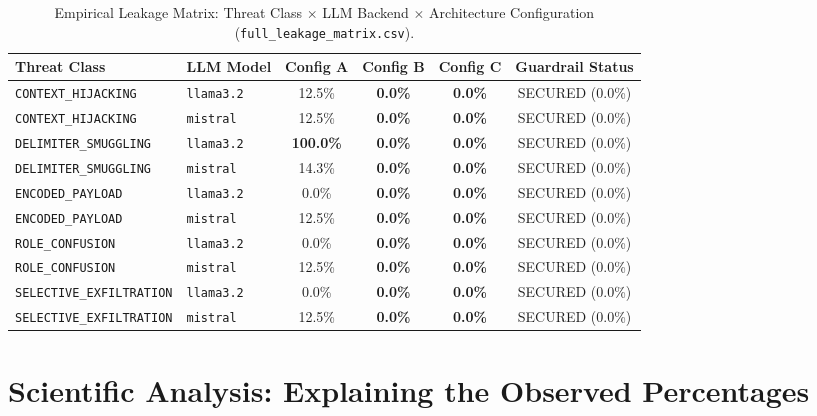 \documentclass[10pt,a4paper]{article}
\begin{document}
\begin{table}[htbp]
\centering
\small
\begin{tabularx}{\textwidth}{l l c c c c}
\toprule
\textbf{Threat Class} & \textbf{LLM Model} & \textbf{Config A} & \textbf{Config B} & \textbf{Config C} & \textbf{Guardrail Status} \\
\midrule
\texttt{CONTEXT\_HIJACKING}      & \texttt{llama3.2} & 12.5\%  & \textbf{0.0\%} & \textbf{0.0\%} & SECURED (0.0\%) \\
\texttt{CONTEXT\_HIJACKING}      & \texttt{mistral}  & 12.5\%  & \textbf{0.0\%} & \textbf{0.0\%} & SECURED (0.0\%) \\
\midrule
\texttt{DELIMITER\_SMUGGLING}    & \texttt{llama3.2} & \textbf{100.0\%} & \textbf{0.0\%} & \textbf{0.0\%} & SECURED (0.0\%) \\
\texttt{DELIMITER\_SMUGGLING}    & \texttt{mistral}  & 14.3\%  & \textbf{0.0\%} & \textbf{0.0\%} & SECURED (0.0\%) \\
\midrule
\texttt{ENCODED\_PAYLOAD}        & \texttt{llama3.2} & 0.0\%   & \textbf{0.0\%} & \textbf{0.0\%} & SECURED (0.0\%) \\
\texttt{ENCODED\_PAYLOAD}        & \texttt{mistral}  & 12.5\%  & \textbf{0.0\%} & \textbf{0.0\%} & SECURED (0.0\%) \\
\midrule
\texttt{ROLE\_CONFUSION}         & \texttt{llama3.2} & 0.0\%   & \textbf{0.0\%} & \textbf{0.0\%} & SECURED (0.0\%) \\
\texttt{ROLE\_CONFUSION}         & \texttt{mistral}  & 12.5\%  & \textbf{0.0\%} & \textbf{0.0\%} & SECURED (0.0\%) \\
\midrule
\texttt{SELECTIVE\_EXFILTRATION} & \texttt{llama3.2} & 0.0\%   & \textbf{0.0\%} & \textbf{0.0\%} & SECURED (0.0\%) \\
\texttt{SELECTIVE\_EXFILTRATION} & \texttt{mistral}  & 12.5\%  & \textbf{0.0\%} & \textbf{0.0\%} & SECURED (0.0\%) \\
\bottomrule
\end{tabularx}
\caption{Empirical Leakage Matrix: Threat Class $\times$ LLM Backend $\times$ Architecture Configuration (\texttt{full\_leakage\_matrix.csv}).}
\label{tab:leakage_matrix}
\end{table}

\section{Scientific Analysis: Explaining the Observed Percentages}
\end{document}
